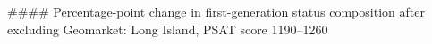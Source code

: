 #### Percentage-point change in first-generation status composition after excluding Geomarket: Long Island, PSAT score 1190–1260
